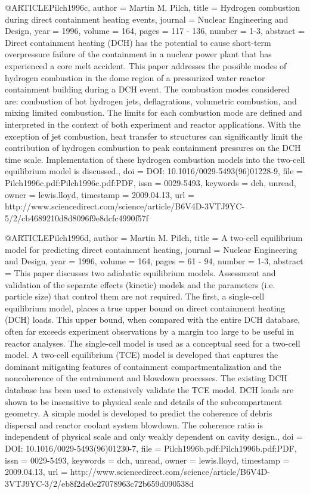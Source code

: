 {@ARTICLE{Pilch1996c,
  author = {Martin M. Pilch},
  title = {Hydrogen combustion during direct containment heating events},
  journal = {Nuclear Engineering and Design},
  year = {1996},
  volume = {164},
  pages = {117 - 136},
  number = {1-3},
  abstract = {Direct containment heating (DCH) has the potential to cause short-term
	overpressure failure of the containment in a nuclear power plant
	that has experienced a core melt accident. This paper addresses the
	possible modes of hydrogen combustion in the dome region of a pressurized
	water reactor containment building during a DCH event. The combustion
	modes considered are: combustion of hot hydrogen jets, deflagrations,
	volumetric combustion, and mixing limited combustion. The limits
	for each combustion mode are defined and interpreted in the context
	of both experiment and reactor applications. With the exception of
	jet combustion, heat transfer to structures can significantly limit
	the contribution of hydrogen combustion to peak containment pressures
	on the DCH time scale. Implementation of these hydrogen combustion
	models into the two-cell equilibrium model is discussed.},
  doi = {DOI: 10.1016/0029-5493(96)01228-9},
  file = {Pilch1996c.pdf:Pilch1996c.pdf:PDF},
  issn = {0029-5493},
  keywords = {dch, unread},
  owner = {lewis.lloyd},
  timestamp = {2009.04.13},
  url = {http://www.sciencedirect.com/science/article/B6V4D-3VTJ9YC-5/2/cb4689210d8d8096f9e8dcfc4990f57f}
}

@ARTICLE{Pilch1996d,
  author = {Martin M. Pilch},
  title = {A two-cell equilibrium model for predicting direct containment heating},
  journal = {Nuclear Engineering and Design},
  year = {1996},
  volume = {164},
  pages = {61 - 94},
  number = {1-3},
  abstract = {This paper discusses two adiabatic equilibrium models. Assessment
	and validation of the separate effects (kinetic) models and the parameters
	(i.e. particle size) that control them are not required. The first,
	a single-cell equilibrium model, places a true upper bound on direct
	containment heating (DCH) loads. This upper bound, when compared
	with the entire DCH database, often far exceeds experiment observations
	by a margin too large to be useful in reactor analyses. The single-cell
	model is used as a conceptual seed for a two-cell model. A two-cell
	equilibrium (TCE) model is developed that captures the dominant mitigating
	features of containment compartmentalization and the noncoherence
	of the entrainment and blowdown processes. The existing DCH database
	has been used to extensively validate the TCE model. DCH loads are
	shown to be insensitive to physical scale and details of the subcompartment
	geometry. A simple model is developed to predict the coherence of
	debris dispersal and reactor coolant system blowdown. The coherence
	ratio is independent of physical scale and only weakly dependent
	on cavity design.},
  doi = {DOI: 10.1016/0029-5493(96)01230-7},
  file = {Pilch1996b.pdf:Pilch1996b.pdf:PDF},
  issn = {0029-5493},
  keywords = {dch, unread},
  owner = {lewis.lloyd},
  timestamp = {2009.04.13},
  url = {http://www.sciencedirect.com/science/article/B6V4D-3VTJ9YC-3/2/eb8f2de0e27078963c72b659d090538d}
}

}
